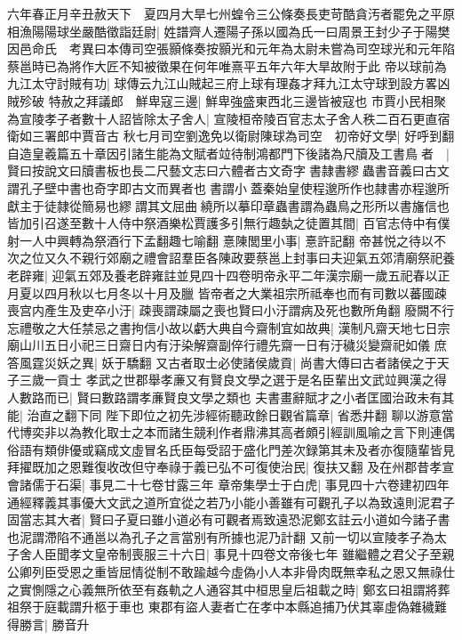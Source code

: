 六年春正月辛丑赦天下　夏四月大旱七州蝗令三公條奏長吏苛酷貪汚者罷免之平原相漁陽陽球坐嚴酷徵詣廷尉|{
	姓譜齊人遷陽子孫以國為氏一曰周景王封少子于陽樊因邑命氏　考異曰本傳司空張顥條奏按顥光和元年為太尉未嘗為司空球光和元年陷蔡邕時已為將作大匠不知被徵果在何年唯熹平五年六年大旱故附于此}
帝以球前為九江太守討賊有功|{
	球傳云九江山賊起三府上球有理姦才拜九江太守球到設方畧凶賊殄破}
特赦之拜議郎　鮮卑寇三邊|{
	鮮卑強盛東西北三邊皆被寇也}
市賈小民相聚為宣陵孝子者數十人詔皆除太子舍人|{
	宣陵桓帝陵百官志太子舍人秩二百石更直宿衛如三署郎中賈音古}
秋七月司空劉逸免以衛尉陳球為司空　初帝好文學|{
	好呼到翻}
自造皇羲篇五十章因引諸生能為文賦者竝待制鴻都門下後諸為尺牘及工書鳥者　|{
	賢曰按說文曰牘書板也長二尺藝文志曰六體者古文奇字書隷書繆蟲書音義曰古文謂孔子壁中書也奇字即古文而異者也書謂小蓋秦始皇使程邈所作也隷書亦程邈所獻主于徒隷從簡易也繆謂其文屈曲繞所以摹印章蟲書謂為蟲鳥之形所以書旛信也}
皆加引召遂至數十人侍中祭酒樂松賈護多引無行趣埶之徒置其間|{
	百官志侍中有僕射一人中興轉為祭酒行下孟翻趣七喻翻}
憙陳閭里小事|{
	憙許記翻}
帝甚悦之待以不次之位又久不親行郊廟之禮會詔羣臣各陳政要蔡邕上封事曰夫迎氣五郊清廟祭祀養老辟雍|{
	迎氣五郊及養老辟雍註並見四十四卷明帝永平二年漢宗廟一歲五祀春以正月夏以四月秋以七月冬以十月及臘}
皆帝者之大業祖宗所祗奉也而有司數以蕃國疎喪宫内產生及吏卒小汙|{
	疎喪謂疎屬之喪也賢曰小汙謂病及死也數所角翻}
廢闕不行忘禮敬之大任禁忌之書拘信小故以虧大典自今齋制宜如故典|{
	漢制凡齋天地七日宗廟山川五日小祀三日齋日内有汙染解齋副倅行禮先齋一日有汙穢災變齋祀如儀}
庶答風霆災妖之異|{
	妖于驕翻}
又古者取士必使諸侯歲貢|{
	尚書大傳曰古者諸侯之于天子三歲一貢士}
孝武之世郡舉孝亷又有賢良文學之選于是名臣輩出文武竝興漢之得人數路而已|{
	賢曰數路謂孝亷賢良文學之類也}
夫書畫辭賦才之小者匡國治政未有其能|{
	治直之翻下同}
陛下即位之初先涉經術聽政餘日觀省篇章|{
	省悉井翻}
聊以游意當代博奕非以為教化取士之本而諸生競利作者鼎沸其高者頗引經訓風喻之言下則連偶俗語有類俳優或竊成文虛冒名氏臣每受詔于盛化門差次録第其未及者亦復隨輩皆見拜擢既加之恩難復收改但守奉祿于義已弘不可復使治民|{
	復扶又翻}
及在州郡昔孝宣會諸儒于石渠|{
	事見二十七卷甘露三年}
章帝集學士于白虎|{
	事見四十六卷建初四年}
通經釋義其事優大文武之道所宜從之若乃小能小善雖有可觀孔子以為致遠則泥君子固當志其大者|{
	賢曰子夏曰雖小道必有可觀者焉致遠恐泥鄭玄註云小道如今諸子書也泥謂滯陷不通邕以為孔子之言當别有所據也泥乃計翻}
又前一切以宣陵孝子為太子舍人臣聞孝文皇帝制喪服三十六日|{
	事見十四卷文帝後七年}
雖繼體之君父子至親公卿列臣受恩之重皆屈情從制不敢踰越今虛偽小人本非骨肉既無幸私之恩又無祿仕之實惻隱之心義無所依至有姦軌之人通容其中桓思皇后祖載之時|{
	鄭玄曰祖謂將葬祖祭于庭載謂升柩于車也}
東郡有盜人妻者亡在孝中本縣追捕乃伏其辜虛偽雜穢難得勝言|{
	勝音升}

